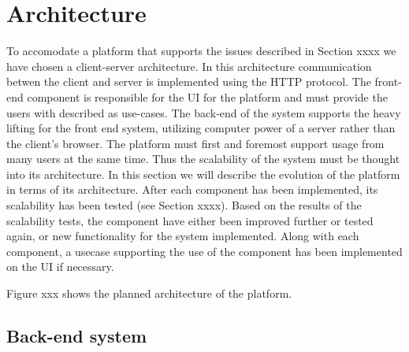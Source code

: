 \section{Architecture}
To accomodate a platform that supports the issues described in Section xxxx we have chosen a client-server architecture. 
In this architecture communication betwen the client and server is implemented using the HTTP protocol. 
The front-end component is responsible for the UI for the platform and must provide the users with described as use-cases.
The back-end of the system supports the heavy lifting for the front end system, utilizing computer power of a server rather than the client's browser. 
The platform must first and foremost support usage from many users at the same time. 
Thus the scalability of the system must be thought into its architecture. 
In this section we will describe the evolution of the platform in terms of its architecture.
After each component has been implemented, its scalability has been tested (see Section xxxx).
Based on the results of the scalability tests, the component have either been improved further or tested again, or new functionality for the system implemented. 
Along with each component, a usecase supporting the use of the component has been implemented on the UI if necessary. 


Figure xxx shows the planned architecture of the platform. 



\subsection{Back-end system}
